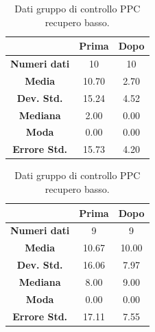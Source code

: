 \begin{table}
\begin{minipage}{0.48\textwidth}
\begin{tabular}{|c|c|c|} \hline
{\textbf{}} & {\textbf{  \hspace{8pt}Prima\hspace{8pt} }} & {\textbf{ \hspace{8pt}Dopo\hspace{8pt}  }}\\ \hline
\textbf{Numeri dati} & 10 & 10 \\
\textbf{Media} & 10.70 & 2.70 \\  
\textbf{Dev. Std.} & 15.24 & 4.52 \\ 
\textbf{Mediana} & 2.00 & 0.00 \\ 
\textbf{Moda} & 0.00 & 0.00 \\ 
\textbf{Errore Std.}& 15.73 & 4.20 \\ 
\hline
\end{tabular}
\caption{Dati gruppo sperimentale PPC recupero basso.}

\label{tab:accuracy} 
\end{minipage}%
\hfill
\begin{minipage}{0.48\textwidth}
\centering

\begin{tabular}{|c|c|c|} \hline
{\textbf{}} & {\textbf{  \hspace{8pt}Prima\hspace{8pt} }} & {\textbf{ \hspace{8pt}Dopo\hspace{8pt}  }}\\ \hline
\textbf{Numeri dati} & 9 & 9 \\ 
\textbf{Media} & 10.67 & 10.00 \\  
\textbf{Dev. Std.} & 16.06 & 7.97 \\  
\textbf{Mediana} & 8.00 & 9.00 \\ 
\textbf{Moda} & 0.00 & 0.00 \\ 
\textbf{Errore Std.} & 17.11 & 7.55\\ 
\hline
\end{tabular}
\caption{Dati gruppo di controllo PPC recupero basso.}

 \label{tab:ompdiff} 
\end{minipage}
\end{table}

